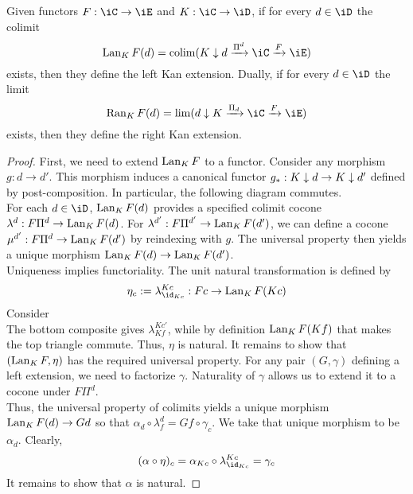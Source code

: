 \documentclass{amsart}
\begin{document}
\begin{prop}
  Given functors $F : \iC \to \iE$ and $K : \iC \to \iD$, if for every $d \in \iD$ the colimit
  \[
    \lan_{K}F(d) = \colim(\xMor{K \dn d}{\Pi^{d}}{\iC} \xMor{}{F}{\iE})
  \]
  exists, then they define the left Kan extension.
  Dually, if for every $d \in \iD$ the limit
  \[
    \ran_{K}F(d) = \lim(\xMor{d \dn K}{\Pi_{d}}{\iC} \xMor{}{F}{\iE})
  \]
  exists, then they define the right Kan extension.
\end{prop}
\begin{proof}
  First, we need to extend $\operatorname{Lan}_{K}F$ to a functor.
  Consider any morphism $g : d \to d'$.
  This morphism induces a canonical functor $g_{*} : K \downarrow d \to K \downarrow d'$ defined by post-composition.
  In particular, the following diagram commutes.
  \[\]
  For each $d \in \iD$, $\operatorname{Lan}_{K}F(d)$ provides a specified colimit cocone $\lambda^{d} : F\Pi^{d} \to \operatorname{Lan}_{K}F(d)$.
  For $\lambda^{d'} : F\Pi^{d'} \to \operatorname{Lan}_{K}F(d')$, we can define a cocone $\mu^{d'} : F\Pi^{d} \to \operatorname{Lan}_{K}F(d')$ by reindexing with $g$.
  The universal property then yields a unique morphism $\operatorname{Lan}_{K}F(d) \to \operatorname{Lan}_{K}F(d')$.
  \[\]
  Uniqueness implies functoriality.
  The unit natural transformation is defined by
  \[
    \eta_{c} := \lambda^{Kc}_{\id_{Kc}} : Fc \to \lan_{K}F(Kc)
  \]
  Consider
  \[\]
  The bottom composite gives $\lambda^{Kc'}_{Kf}$, while by definition $\operatorname{Lan}_{K}F(Kf)$ that makes the top triangle commute.
  Thus, $\eta$ is natural.
  It remains to show that $(\operatorname{Lan}_{K}F, \eta)$ has the required universal property.
  For any pair $(G, \gamma)$ defining a left extension, we need to factorize $\gamma$.
  Naturality of $\gamma$ allows us to extend it to a cocone under $F\Pi^{d}$.
  \[\]
  Thus, the universal property of colimits yields a unique morphism $\operatorname{Lan}_{K}F(d) \to Gd$ so that $\alpha_{d} \circ \lambda^{d}_{f} = Gf \circ \gamma_{c}$.
  We take that unique morphism to be $\alpha_{d}$.
  Clearly,
  \[
    (\alpha \circ \eta)_{c} = \alpha_{Kc} \circ \lambda^{Kc}_{\id_{Kc}} = \gamma_{c}
  \]
  It remains to show that $\alpha$ is natural.
\end{proof}



\end{document}

